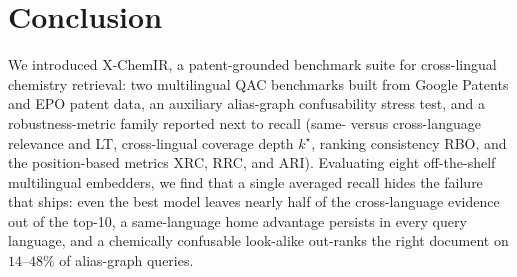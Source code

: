 \section{Conclusion}


We introduced X-ChemIR, a patent-grounded benchmark suite for cross-lingual chemistry
retrieval: two multilingual QAC benchmarks built from Google Patents and EPO patent
data, an auxiliary alias-graph confusability stress test, and a robustness-metric family
reported next to recall (same- versus cross-language relevance and LT, cross-lingual
coverage depth $k^\star$, ranking consistency RBO, and the position-based metrics
XRC, RRC, and ARI). Evaluating eight off-the-shelf multilingual embedders, we find that a
single averaged recall hides the failure that ships: even the best model leaves nearly
half of the cross-language evidence out of the top-10, a same-language home advantage
persists in every query language, and a chemically confusable look-alike out-ranks the
right document on $14$--$48\%$ of alias-graph queries.